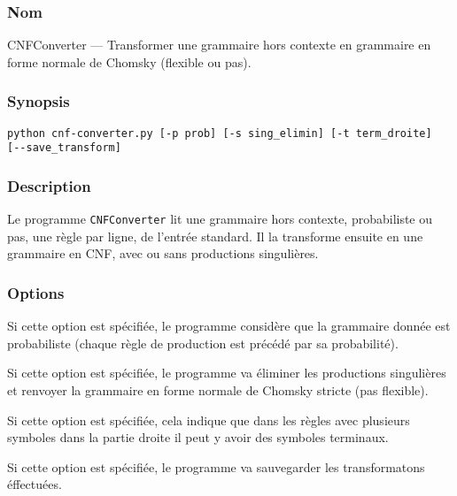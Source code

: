 \documentclass[12pt]{article}
\begin{document}
\subsubsection{Nom}
 
CNFConverter --- Transformer une grammaire hors contexte en grammaire en forme
normale de Chomsky (flexible ou pas).
 
\subsubsection{Synopsis}
 
{\ttfamily
\begin{verbatim}
python cnf-converter.py [-p prob] [-s sing_elimin] [-t term_droite]
[--save_transform]
\end{verbatim}
}
 
\subsubsection{Description}
 
Le programme \texttt{CNFConverter} lit une grammaire hors contexte, probabiliste
ou pas, une règle par ligne, de l'entrée standard.
Il la transforme ensuite en une grammaire en CNF, avec ou sans productions
singulières. 

\subsubsection{Options}

\begin{description}[style=nextline]
\item[\texttt{-p, --prob}] Si cette option est spécifiée, le programme considère
que la grammaire donnée est probabiliste (chaque règle de production est
précédé par sa probabilité).
\item[\texttt{-s, --sing\_elimin}] Si cette option est spécifiée, le programme
va éliminer les productions singulières et renvoyer la grammaire en forme normale
de Chomsky stricte (pas flexible).
\item[\texttt{-t, --term\_droite}] Si cette option est spécifiée, cela
indique que dans les règles avec plusieurs symboles dans la partie
droite il peut y avoir des symboles terminaux.
\item[\texttt{--save\_transform}] Si cette option est spécifiée, le programme va
sauvegarder les transformatons éffectuées.
\end{description}
\end{document}
